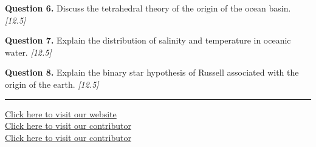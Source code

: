 \documentclass[11pt,a4paper]{article}
\newcommand{\pts}[1]{\hfill   \textit{[#1]}}
\begin{document}
\medskip


\noindent   \textbf{Question 6.} Discuss the tetrahedral theory of the origin of the ocean basin. \pts{12.5}

\medskip


\noindent   \textbf{Question 7.} Explain the distribution of salinity and temperature in oceanic water. \pts{12.5}

\medskip


\noindent   \textbf{Question 8.} Explain the binary star hypothesis of Russell associated with the origin of the earth. \pts{12.5}

\vfill\rule{\linewidth}{0.4pt}

\begin{center}\small
\href{https://bhu-exam.vercel.app/}{Click here to visit our website}\\[4pt]
\href{https://me-aryan.vercel.app/}{Click here to visit our contributor}\\[4pt]
\href{https://quashan-me.vercel.app/}{Click here to visit our contributor}
\end{center}
\end{document}
